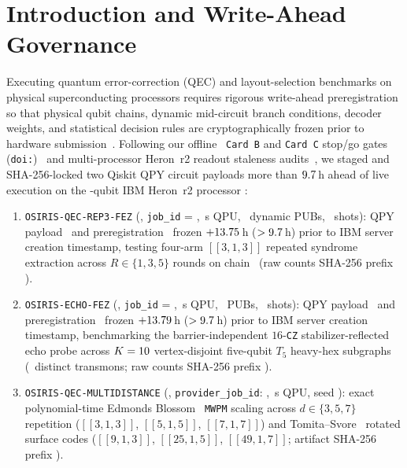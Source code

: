 \documentclass[aps,prx,twocolumn,superscriptaddress,nofootinbib]{revtex4-2}
\begin{document}
\section{Introduction and Write-Ahead Governance}
Executing quantum error-correction (QEC) and layout-selection benchmarks on physical superconducting processors requires rigorous write-ahead preregistration so that physical qubit chains, dynamic mid-circuit branch conditions, decoder weights, and statistical decision rules are cryptographically frozen prior to hardware submission~\cite{GoogleSurface2023,GoogleWillow2025,MiaoLeakage2023,ChamberlandHeavyHex2020,QuantinuumLogical2024}. Following our offline \remSimTier\ \texttt{Card B} and \texttt{Card C} stop/go gates (\texttt{doi:\remPriorZenodoDoi})~\cite{DavisPaper8Zenodo2026} and multi-processor Heron~r2 readout staleness audits~\cite{DavisRO0607Zenodo2026}, we staged and SHA-256-locked two Qiskit QPY circuit payloads more than $9.7$\,h ahead of live execution on the \remHeronQubits-qubit IBM Heron~r2 processor \remBackend:
\begin{enumerate}
  \item \texttt{OSIRIS-QEC-REP3-FEZ} (\remHwTier, \texttt{job\_id} = \remRepJobId, \remRepQpuSec\,s QPU, \remRepTotalPubs\ dynamic PUBs, \remRepTotalShots\ shots): QPY payload \remRepQpyShaPrefix\ and preregistration \remRepPreregShaPrefix\ frozen $+13.75$\,h ($>9.7$\,h) prior to IBM server creation timestamp, testing four-arm $[[3,1,3]]$ repeated syndrome extraction across $R \in \{1, 3, 5\}$ rounds on chain \remRepChain\ (raw counts SHA-256 prefix \remRepRawGzShaPrefix).
  \item \texttt{OSIRIS-ECHO-FEZ} (\remHwTier, \texttt{job\_id} = \remEchoJobId, \remEchoQpuSec\,s QPU, \remEchoTotalPubs\ PUBs, \remEchoTotalShots\ shots): QPY payload \remEchoQpyShaPrefix\ and preregistration \remEchoPreregShaPrefix\ frozen $+13.79$\,h ($>9.7$\,h) prior to IBM server creation timestamp, benchmarking the barrier-independent $16$-\texttt{CZ} stabilizer-reflected echo probe across $K = 10$ vertex-disjoint five-qubit $T_5$ heavy-hex subgraphs (\remEchoTotalTransmons\ distinct transmons; raw counts SHA-256 prefix \remEchoRawGzShaPrefix).
  \item \texttt{OSIRIS-QEC-MULTIDISTANCE} (\remSimTier, \texttt{provider\_job\_id}: \remSimJobId, \remSimQpuSec\,s QPU, seed \remMultiSeed): exact polynomial-time Edmonds Blossom~\cite{EdmondsBlossom1965} \texttt{MWPM} scaling across $d \in \{3, 5, 7\}$ repetition ($[[3,1,3]]$, $[[5,1,5]]$, $[[7,1,7]]$) and Tomita--Svore~\cite{TomitaSvore2014} rotated surface codes ($[[9,1,3]]$, $[[25,1,5]]$, $[[49,1,7]]$; artifact SHA-256 prefix \remMultidistRepShaPrefix).
\end{enumerate}
\end{document}
